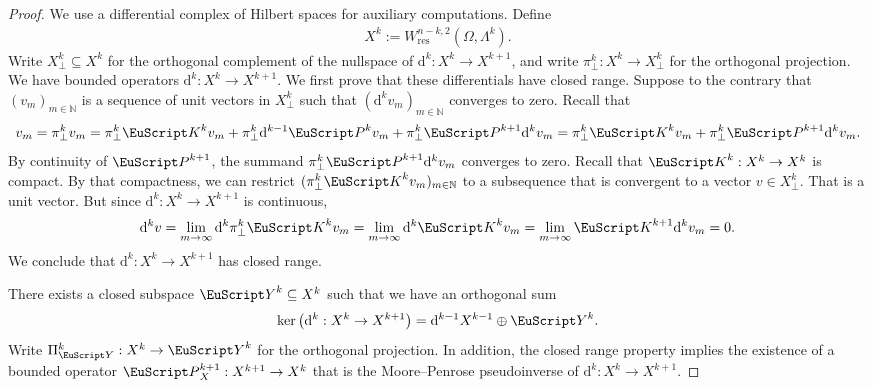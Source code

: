 \documentclass[10pt,a4paper]{amsart}
\theoremstyle{definition}
\theoremstyle{remark}
\numberwithin{equation}{section}
\newcommand{\bbN}{{\mathbb N}}
\newcommand{\euK}{{\EuScript K}}
\newcommand{\euP}{{\EuScript P}}
\newcommand{\euY}{{\EuScript Y}}
\newcommand{\cartan}{{\mathrm d}}
\newcommand{\Domain}{{\Omega}}
\newcommand{\Alt}[1]{\Lambda^{#1}}
\newcommand{\Proj}{\pi}
\newcommand{\Projection}{\Pi}
\newcommand{\Poincare}{\euP}
\newcommand{\Defect}{\euK}
\newcommand{\Wres}{W_{\mathrm{res}}}
\begin{document}
\begin{proof}
    \newcommand{\Hilbertcomplement}{\euY}
    We use a differential complex of Hilbert spaces for auxiliary computations. Define 
    \begin{align*}
        X^{k} := \Wres^{n-k,2}(\Domain,\Alt{k}).
    \end{align*}
    Write $X^{k}_{\perp} \subseteq X^{k}$ for the orthogonal complement of the nullspace of $\cartan^{k} : X^{k} \to X^{k+1}$,
    and write $\Proj_{\perp}^{k} : X^{k} \to X^{k}_{\perp}$ for the orthogonal projection. 
We have bounded operators $\cartan^{k} : X^{k} \to X^{k+1}$. We first prove that these differentials have closed range.
    Suppose to the contrary that $(v_{m})_{m \in \bbN}$ is a sequence of unit vectors in $X^{k}_{\perp}$ 
    such that $(\cartan^{k} v_{m})_{m \in \bbN}$ converges to zero. 
    Recall that 
    \begin{align*}
        v_{m} 
        = 
        \Proj_{\perp}^{k} v_{m} 
        = 
        \Proj_{\perp}^{k} \Defect^{k} v_{m} + \Proj_{\perp}^{k} \cartan^{k-1} \Poincare^{k} v_{m} + \Proj_{\perp}^{k} \Poincare^{k+1} \cartan^{k} v_{m}
        = 
        \Proj_{\perp}^{k} \Defect^{k} v_{m} + \Proj_{\perp}^{k} \Poincare^{k+1} \cartan^{k} v_{m}
        .
    \end{align*}
    By continuity of $\Poincare^{k+1}$, the summand $\Proj_{\perp}^{k} \Poincare^{k+1} \cartan^{k} v_{m}$ converges to zero.
    Recall that $\Defect^{k} : X^{k} \to X^{k}$ is compact. 
    By that compactness, we can restrict $(\Proj_{\perp}^{k} \Defect^{k} v_{m})_{m \in \bbN}$ to a subsequence that is convergent to a vector $v \in X^{k}_{\perp}$.
    That is a unit vector. 
    But since $\cartan^{k} : X^{k} \to X^{k+1}$ is continuous,
    \begin{align*}
        \cartan^{k} v 
        = 
        \lim_{m \rightarrow \infty} \cartan^{k} \Proj_{\perp}^{k} \Defect^{k} v_{m} 
        = 
        \lim_{m \rightarrow \infty} \cartan^{k} \Defect^{k} v_{m} 
        = 
        \lim_{m \rightarrow \infty} \Defect^{k+1} \cartan^{k} v_{m} 
        = 
        0
        .
    \end{align*}
    We conclude that $\cartan^{k} : X^{k} \to X^{k+1}$ has closed range.


    There exists a closed subspace $\Hilbertcomplement^{k} \subseteq X^{k}$ such that we have an orthogonal sum 
    \begin{align*}
        \ker\left( \cartan^{k} : X^{k} \to X^{k+1} \right) = \cartan^{k-1} X^{k-1} \oplus \Hilbertcomplement^{k}
        .
    \end{align*}
    Write $\Projection_{\Hilbertcomplement}^{k} : X^{k} \to \Hilbertcomplement^{k}$ for the orthogonal projection. 
    In addition, the closed range property implies the existence of a bounded operator 
    $\Poincare_{X}^{k+1} : X^{k+1} \to X^{k}$ that is the Moore--Penrose pseudoinverse of $\cartan^{k} : X^{k} \to X^{k+1}$.
    

\end{proof}
\end{document}
